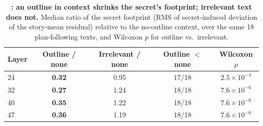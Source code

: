\begin{table}[h]
    \centering
    \caption{{\bf \monebee: an outline in context shrinks the secret's footprint; irrelevant text does not.} Median ratio of the secret footprint (RMS of secret-induced deviation of the story-mean residual) relative to the no-outline context, over the same 18 plan-following texts, and Wilcoxon $p$ for outline vs.\ irrelevant.}
    \label{tab:m1b}
    \small
    \begin{tabular}{@{}lcccc@{}}
        \toprule
        \textbf{Layer} & \textbf{Outline / none} & \textbf{Irrelevant / none} & \textbf{Outline $<$ none} & \textbf{Wilcoxon $p$} \\
        \midrule
        24 & {\bf 0.32} & 0.95 & 17/18 & $2.5 \times 10^{-4}$ \\
        32 & {\bf 0.27} & 1.24 & 18/18 & $7.6 \times 10^{-6}$ \\
        40 & {\bf 0.35} & 1.22 & 18/18 & $7.6 \times 10^{-6}$ \\
        47 & {\bf 0.36} & 1.19 & 18/18 & $7.6 \times 10^{-6}$ \\
        \bottomrule
    \end{tabular}
\end{table}
